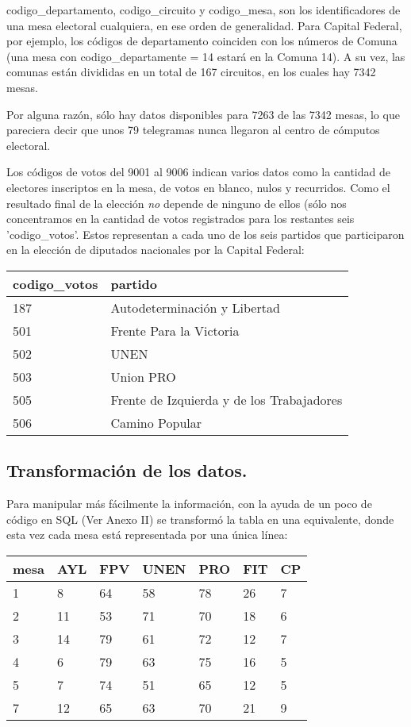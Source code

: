 \documentclass[12pt, a4paper]{article}
\begin{document}
codigo\_departamento, codigo\_circuito y codigo\_mesa, son los identificadores de una mesa electoral cualquiera, en ese orden de generalidad. Para Capital Federal, por ejemplo, los c\'odigos de departamento coinciden con los n\'umeros de Comuna (una mesa con codigo\_departamente = 14 estar\'a en la Comuna 14). A su vez, las comunas est\'an divididas en un total de 167 circuitos, en los cuales hay 7342 mesas.

Por alguna raz\'on, s\'olo hay datos disponibles para 7263 de las 7342 mesas, lo que pareciera decir que unos 79 telegramas nunca llegaron al centro de c\'omputos electoral.

Los c\'odigos de votos del 9001 al 9006 indican varios datos como la cantidad de electores inscriptos en la mesa, de votos en blanco, nulos y recurridos. Como el resultado final de la elecci\'on \emph{no} depende de ninguno de ellos (s\'olo nos concentramos en la cantidad de votos registrados para los restantes seis 'codigo\_votos'. Estos representan a cada uno de los seis partidos que participaron en la elecci\'on de diputados nacionales por la Capital Federal:

\begin{center}
	\begin{tabular}{ll}
		codigo\_votos & partido \\ \hline
			  187 & Autodeterminaci\'on y Libertad\\
		   501 & Frente Para la Victoria \\
		   502 & UNEN \\
		   503 & Union PRO \\
		   505 & Frente de Izquierda y de los Trabajadores \\
		   506 & Camino Popular \\
	\end{tabular}
\end{center}
 
\subsection{Transformaci\'on de los datos.}

Para manipular m\'as f\'acilmente la informaci\'on, con la ayuda de un poco de c\'odigo en SQL (Ver Anexo II) se transform\'o la tabla en una equivalente, donde esta vez cada mesa est\'a representada por una \'unica l\'inea:

\begin{center}
	\begin{tabular}{l | llllll}
mesa & AYL & FPV & UNEN & PRO & FIT & CP \\ \hline
1 & 8 & 64 & 58 & 78 & 26 & 7 \\
2 & 11 & 53 & 71 & 70 & 18 & 6 \\
3 & 14 & 79 & 61 & 72 & 12 & 7 \\
4 & 6 & 79 & 63 & 75 & 16 & 5 \\
5 & 7 & 74 & 51 & 65 & 12 & 5 \\
7 & 12 & 65 & 63 & 70 & 21 & 9 \\
	\end{tabular}
\end{center}
\end{document}
